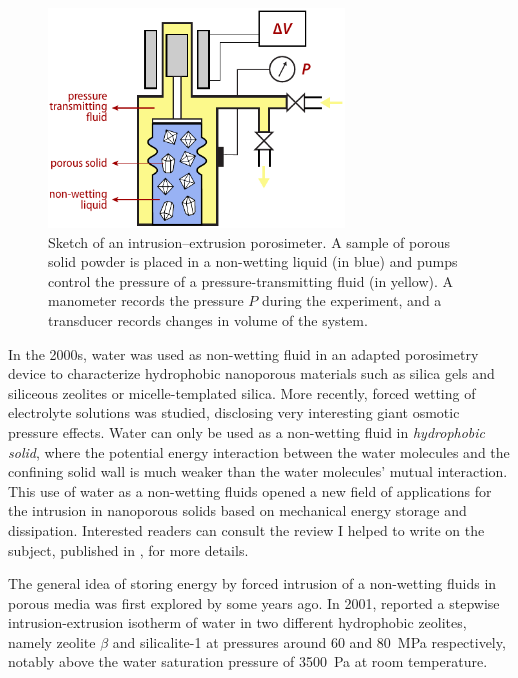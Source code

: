 \documentclass[thesis]{subfiles}
\begin{document}
\begin{figure}[htb]
    \centering
    \includegraphics[width=0.7\textwidth]{figures/images/porosimeter}
    \caption{Sketch of an intrusion--extrusion porosimeter. A sample of porous
    solid powder is placed in a non-wetting liquid (in blue) and pumps control
    the pressure of a pressure-transmitting fluid (in yellow). A manometer
    records the pressure $P$ during the experiment, and a transducer records
    changes in volume of the system.}
  \label{fig:porosimeter}
\end{figure}

\newpage
In the 2000s, water was used as non-wetting fluid in an adapted porosimetry device
to characterize hydrophobic nanoporous materials such as silica
gels\cite{Fadeev1997} and siliceous zeolites\cite{Eroshenko2001, Eroshenko2002}
or micelle-templated silica\cite{Lefevre2004}. More recently, forced wetting of
electrolyte solutions was studied, disclosing very interesting giant osmotic
pressure effects\cite{Liu2009, MichelinJamois2015}. Water can only be used as a
non-wetting fluid in \emph{hydrophobic solid}, where the potential energy
interaction between the water molecules and the confining solid wall is much
weaker than the water molecules' mutual interaction. This use of water as a
non-wetting fluids opened a new field of applications for the intrusion in
nanoporous solids based on mechanical energy storage and
dissipation\cite{Eroshenko2001, Fraux2017-2}. Interested readers can consult the
review I helped to write on the subject, published in
\cite{Fraux2017-2}, for more details.

The general idea of storing energy by forced intrusion of a non-wetting fluids
in porous media was first explored by \citeauthor{Fadeev1997} some years
ago\cite{Fadeev1997}. In 2001, \citeauthor{Eroshenko2001}\cite{Eroshenko2001}
reported a stepwise intrusion-extrusion isotherm of water in two different
hydrophobic zeolites, namely zeolite $\beta$ and silicalite-1 at pressures
around 60 and \SI{80}{MPa} respectively, \ie notably above the water saturation
pressure of \SI{3 500}{Pa} at room temperature.
\end{document}
